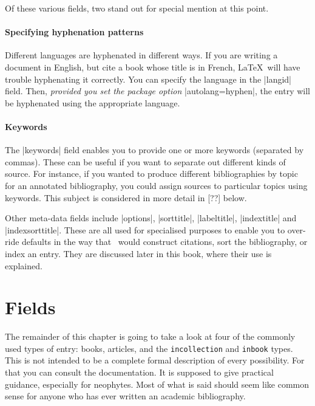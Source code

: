 {Of these various fields, two stand out for special mention at this point.

\paragraph{Specifying hyphenation patterns}Different languages are hyphenated in different ways. If you are writing a document in English, but cite a book whose title is in French, \LaTeX\ will have trouble hyphenating it correctly. You can specify the language in the |langid| field. Then, \emph{provided you set the package option} |autolang=hyphen|, the entry will be hyphenated using the appropriate language.

\paragraph{Keywords} The |keywords| field enables you to provide one or more keywords (separated by commas). These can be useful if you want to separate out different kinds of source. For instance, if you wanted to produce different bibliographies by topic for an annotated bibliography, you could assign sources to particular topics using keywords. This subject is considered in more detail in [??] below.

Other meta-data fields include |options|, |sorttitle|, |labeltitle|, |indextitle| and |indexsorttitle|. These are all used for specialised purposes to enable you to over-ride defaults in the way that \biblatex\ would construct citations, sort the bibliography, or index an entry. They are discussed later in this book, where their use is explained.


\section{Fields}

The remainder of this chapter is going to take a look at four of the commonly used types of entry: books, articles, and the \verb|incollection| and \verb|inbook| types. This is not intended to be a complete formal description of every possibility. For that you can consult the documentation. It is supposed to give practical guidance, especially for neophytes. Most of what is said should seem like common sense for anyone who has ever written an academic bibliography.

}
